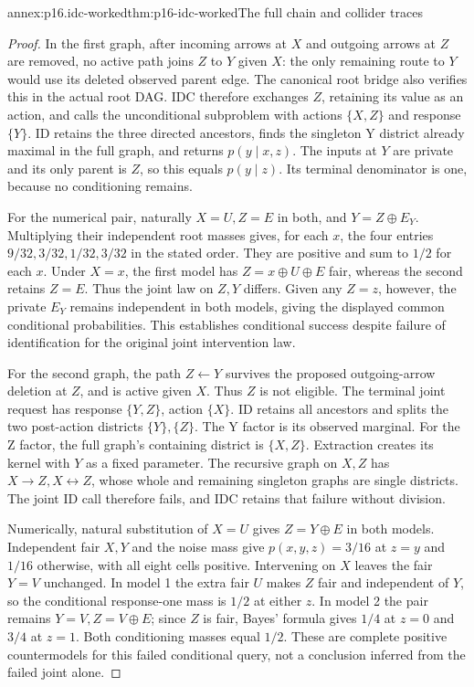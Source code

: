 \begin{annexitem}{annex:p16.idc-worked}{thm:p16-idc-worked}{The full chain and collider traces}
\begin{proof}
In the first graph, after incoming arrows at \(X\) and
outgoing arrows at \(Z\) are removed, no active path joins
\(Z\) to \(Y\) given \(X\): the only remaining route
to \(Y\) would use its deleted observed parent edge. The
canonical root bridge also verifies this in the actual root DAG.
IDC therefore exchanges \(Z\), retaining its value as an
action, and calls the unconditional subproblem with actions
\(\{X,Z\}\) and response \(\{Y\}\). ID retains
the three directed ancestors, finds the singleton Y district
already maximal in the full graph, and returns
\(p(y\mid x,z)\). The inputs at \(Y\) are private and
its only parent is \(Z\), so this equals \(p(y\mid z)\).
Its terminal denominator is one, because no conditioning remains.

For the numerical pair, naturally \(X=U,Z=E\) in both,
and \(Y=Z\oplus E_Y\). Multiplying their independent
root masses gives, for each \(x\), the four entries
\(9/32,3/32,1/32,3/32\) in the stated order. They are
positive and sum to \(1/2\) for each \(x\). Under
\(X=x\), the first model has \(Z=x\oplus U\oplus E\)
fair, whereas the second retains \(Z=E\). Thus the joint
law on \(Z,Y\) differs. Given any \(Z=z\), however,
the private \(E_Y\) remains independent in both models, giving
the displayed common conditional probabilities. This establishes
conditional success despite failure of identification for the
original joint intervention law.

For the second graph, the path \(Z\leftarrow Y\) survives
the proposed outgoing-arrow deletion at \(Z\), and is active
given \(X\). Thus \(Z\) is not eligible. The terminal
joint request has response \(\{Y,Z\}\), action \(\{X\}\).
ID retains all ancestors and splits the two post-action districts
\(\{Y\},\{Z\}\). The Y factor is its observed marginal.
For the Z factor, the full graph's containing district is
\(\{X,Z\}\). Extraction creates its kernel with \(Y\)
as a fixed parameter. The recursive graph on \(X,Z\)
has \(X\to Z,X\leftrightarrow Z\), whose whole and
remaining singleton graphs are single districts. The joint ID
call therefore fails, and IDC retains that failure without division.

Numerically, natural substitution of \(X=U\) gives
\(Z=Y\oplus E\) in both models. Independent fair \(X,Y\)
and the noise mass give \(p(x,y,z)=3/16\) at \(z=y\)
and \(1/16\) otherwise, with all eight cells positive.
Intervening on \(X\) leaves the fair \(Y=V\) unchanged.
In model 1 the extra fair \(U\) makes \(Z\) fair and
independent of \(Y\), so the conditional response-one mass
is \(1/2\) at either \(z\). In model 2 the pair remains
\(Y=V,Z=V\oplus E\); since \(Z\) is fair, Bayes'
formula gives \(1/4\) at \(z=0\) and \(3/4\) at
\(z=1\). Both conditioning masses equal \(1/2\).
These are complete positive countermodels for this failed conditional
query, not a conclusion inferred from the failed joint alone.
\end{proof}
\end{annexitem}
